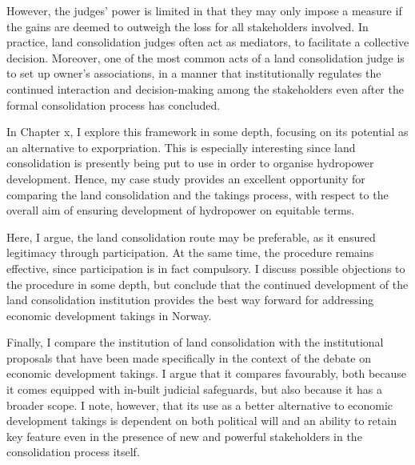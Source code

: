 However, the judges' power is limited in that they may only impose a measure if the gains are deemed to outweigh the loss for all stakeholders involved. In practice, land consolidation judges often act as mediators, to facilitate a collective decision. Moreover, one of the most common acts of a land consolidation judge is to set up owner's associations, in a manner that institutionally regulates the continued interaction and decision-making among the stakeholders even after the formal consolidation process has concluded.

In Chapter x, I explore this framework in some depth, focusing on its potential as an alternative to exporpriation. This is especially interesting since land consolidation is presently being put to use in order to organise hydropower development. Hence, my case study provides an excellent opportunity for comparing the land consolidation and the takings process, with respect to the overall aim of ensuring development of hydropower on equitable terms. 

Here, I argue, the land consolidation route may be preferable, as it ensured legitimacy through participation. At the same time, the procedure remains effective, since participation is in fact compulsory. I discuss possible objections to the procedure in some depth, but conclude that the continued development of the land consolidation institution provides the best way forward for addressing economic development takings in Norway.

Finally, I compare the institution of land consolidation with the institutional proposals that have been made specifically in the context of the debate on economic development takings. I argue that it compares favourably, both because it comes equipped with in-built judicial safeguards, but also because it has a broader scope. I note, however, that its use as a better alternative to economic development takings is dependent on both political will and an ability to retain key feature even in the presence of new and powerful stakeholders in the consolidation process itself.



